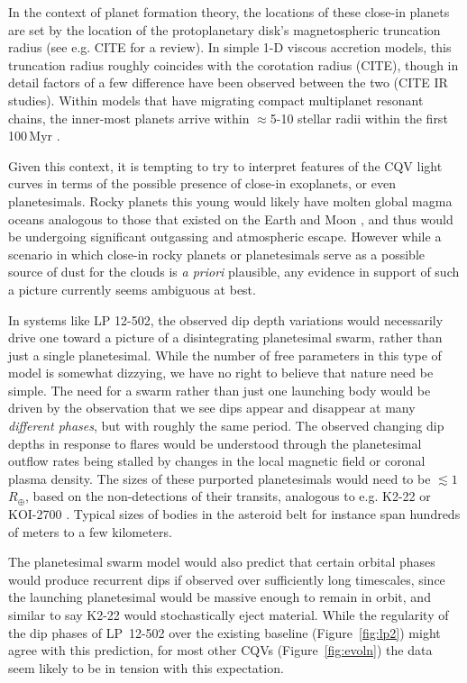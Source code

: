 \documentclass[11pt,twocolumn,tighten]{aastex63}
\begin{document}
In the context of planet formation theory, the locations of these
close-in planets are set by the location of the protoplanetary disk's
magnetospheric truncation radius (see e.g. CITE for a review).  In
simple 1-D viscous accretion models, this truncation radius roughly
coincides with the corotation radius (CITE), though in detail factors
of a few difference have been observed between the two (CITE IR
studies).  Within models that have migrating compact multiplanet
resonant chains, the inner-most planets arrive within $\approx$5-10
stellar radii within the first 100\,Myr \citep{2018haex.bookE.142I}.

Given this context, it is tempting to try to interpret features of the
CQV light curves in terms of the possible presence of close-in
exoplanets, or even planetesimals.  Rocky planets this young would
likely have molten global magma oceans analogous to those that existed
on the Earth and Moon \citep[see][]{2022arXiv220310023L}, and thus
would be undergoing significant outgassing and atmospheric escape.
However while a scenario in which close-in rocky planets or
planetesimals serve as a possible source of dust for the clouds is
{\it a priori} plausible, any evidence in support of such a picture
currently seems ambiguous at best.

In systems like LP 12-502, the observed dip depth variations would
necessarily drive one toward a picture of a disintegrating
planetesimal swarm, rather than just a single planetesimal.  
While the
number of free parameters in this type of model is somewhat dizzying,
we have no right to believe that nature need be simple.
The need for a swarm rather than just one launching body would
be driven by the observation that we see dips appear and disappear at
many {\it different phases}, but with roughly the same period.
The observed changing dip depths in response to flares would be
understood through the planetesimal outflow rates being stalled by
changes in the local magnetic field or coronal plasma density.
The sizes of these purported planetesimals
would need to be $\lesssim 1$\,$R_\oplus$, based on the non-detections
of their transits, analogous to e.g.  K2-22
\citep{2015ApJ...812..112S} or KOI-2700 \citep{2014ApJ...784...40R}.
Typical sizes of bodies in the asteroid belt for instance span
hundreds of meters to a few kilometers.

The planetesimal swarm model would also predict that certain orbital
phases would produce recurrent dips if observed over sufficiently long
timescales, since the launching planetesimal would be massive enough
to remain in orbit, and similar to say K2-22 would stochastically
eject material.  While the regularity of the dip phases of LP~12-502
over the existing baseline (Figure~\ref{fig:lp2}) might agree with
this prediction, 
for most other CQVs (Figure~\ref{fig:evoln}) the data seem likely to
be in tension with this expectation.
\end{document}
